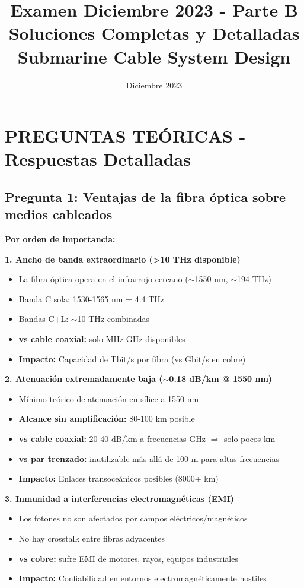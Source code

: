 \documentclass[a4paper,10pt]{article}
\title{\textbf{Examen Diciembre 2023 - Parte B\\Soluciones Completas y Detalladas\\Submarine Cable System Design}}
\author{}
\date{Diciembre 2023}
\begin{document}
\maketitle
\tableofcontents
\newpage

\section{PREGUNTAS TEÓRICAS - Respuestas Detalladas}

\subsection{Pregunta 1: Ventajas de la fibra óptica sobre medios cableados}

\textbf{Por orden de importancia:}

\textbf{1. Ancho de banda extraordinario (>10 THz disponible)}
\begin{itemize}[leftmargin=*]
    \item La fibra óptica opera en el infrarrojo cercano ($\sim$1550 nm, $\sim$194 THz)
    \item Banda C sola: 1530-1565 nm = 4.4 THz
    \item Bandas C+L: $\sim$10 THz combinadas
    \item \textbf{vs cable coaxial:} solo MHz-GHz disponibles
    \item \textbf{Impacto:} Capacidad de Tbit/s por fibra (vs Gbit/s en cobre)
\end{itemize}

\textbf{2. Atenuación extremadamente baja ($\sim$0.18 dB/km @ 1550 nm)}
\begin{itemize}[leftmargin=*]
    \item Mínimo teórico de atenuación en sílice a 1550 nm
    \item \textbf{Alcance sin amplificación:} 80-100 km posible
    \item \textbf{vs cable coaxial:} 20-40 dB/km a frecuencias GHz $\Rightarrow$ solo pocos km
    \item \textbf{vs par trenzado:} inutilizable más allá de 100 m para altas frecuencias
    \item \textbf{Impacto:} Enlaces transoceánicos posibles (8000+ km)
\end{itemize}

\textbf{3. Inmunidad a interferencias electromagnéticas (EMI)}
\begin{itemize}[leftmargin=*]
    \item Los fotones no son afectados por campos eléctricos/magnéticos
    \item No hay crosstalk entre fibras adyacentes
    \item \textbf{vs cobre:} sufre EMI de motores, rayos, equipos industriales
    \item \textbf{Impacto:} Confiabilidad en entornos electromagnéticamente hostiles
\end{itemize}
\end{document}
